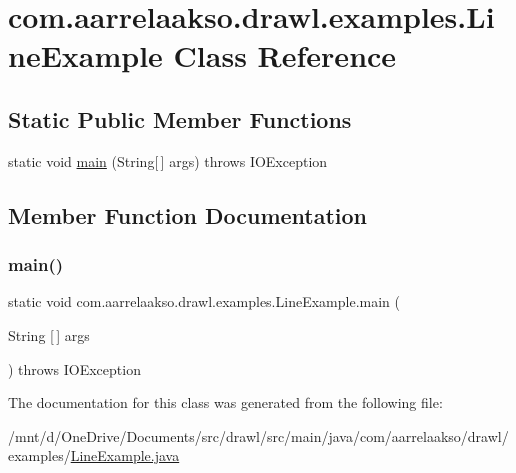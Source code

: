 \hypertarget{classcom_1_1aarrelaakso_1_1drawl_1_1examples_1_1_line_example}{}\section{com.\+aarrelaakso.\+drawl.\+examples.\+Line\+Example Class Reference}
\label{classcom_1_1aarrelaakso_1_1drawl_1_1examples_1_1_line_example}
\subsection*{Static Public Member Functions}
\begin{DoxyCompactItemize}
\item 
static void \hyperlink{classcom_1_1aarrelaakso_1_1drawl_1_1examples_1_1_line_example_ad1d9edf57e4ba04895c95bf1e6e9ac70}{main} (String\mbox{[}$\,$\mbox{]} args)  throws I\+O\+Exception     
\end{DoxyCompactItemize}


\subsection{Member Function Documentation}
\mbox{\label{classcom_1_1aarrelaakso_1_1drawl_1_1examples_1_1_line_example_ad1d9edf57e4ba04895c95bf1e6e9ac70}} 
\subsubsection{\texorpdfstring{main()}{main()}}
{\footnotesize\ttfamily static void com.\+aarrelaakso.\+drawl.\+examples.\+Line\+Example.\+main (\begin{DoxyParamCaption}\item[{String \mbox{[}$\,$\mbox{]}}]{args }\end{DoxyParamCaption}) throws I\+O\+Exception\hspace{0.3cm}{\ttfamily [static]}}



The documentation for this class was generated from the following file\+:\begin{DoxyCompactItemize}
\item 
/mnt/d/\+One\+Drive/\+Documents/src/drawl/src/main/java/com/aarrelaakso/drawl/examples/\hyperlink{_line_example_8java}{Line\+Example.\+java}\end{DoxyCompactItemize}
